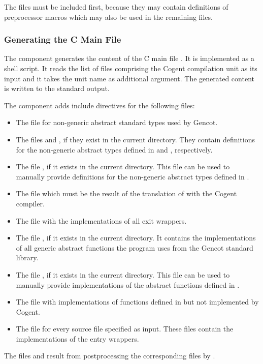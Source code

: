 The files  must be included first, because they may contain definitions of preprocessor macros
which may also be used in the remaining files.

\subsubsection{Generating the C Main File}

The component  generates the content of the C main file . 
It is implemented as a shell script. It reads the list of
 files comprising the Cogent compilation unit as its input and it takes the unit name 
as additional argument. The generated content is written to the standard output. 

The component adds include directives for the following files:
\begin{itemize}
\item The file  for non-generic abstract standard types used by Gencot.
\item The files  and , if they exist in the current directory. 
They contain definitions for the non-generic abstract types defined in  and 
, respectively.
\item The file , if it exists in the current directory. This file can be used to
manually provide definitions for the non-generic abstract types defined in .
\item The file  which must be the result of the translation of 
with the Cogent compiler.
\item The file  with the implementations of all exit wrappers.
\item The file , if it exists in the current directory. It contains the 
implementations of all generic abstract functions the program uses from the Gencot standard library.
\item The file , if it exists in the current directory. This file can be used to
manually provide implementations of the abstract functions defined in .
\item The file  with implementations of functions defined in 
but not implemented by Cogent.
\item The file  for every source file  specified as input. These files contain
the implementations of the entry wrappers.
\end{itemize}

The files  and  result from postprocessing the corresponding 
 files by .
